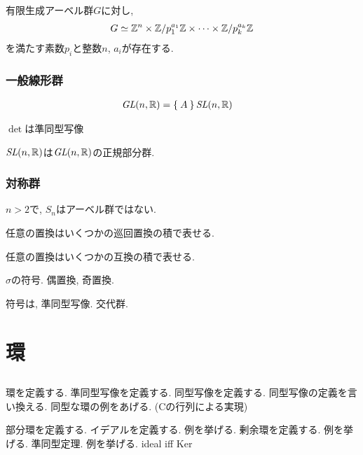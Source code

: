   
  \begin{theorem}
    [有限生成アーベル群の基本定理]
    有限生成アーベル群$G$に対し,
    \begin{align*}
      G\simeq \mathbb{Z}^n \times \mathbb{Z}/p_1^{a_1} \mathbb{Z} \times \cdots \times \mathbb{Z}/p_k^{a_k}\mathbb{Z}
    \end{align*}
    を満たす素数$p_i$と整数$n$, $a_i$が存在する.
  \end{theorem}


  \subsection{一般線形群}
  \begin{align*}
    \textit{GL}(n,\mathbb{R})&=\Set{A}
    \textit{SL}(n,\mathbb{R})&
  \end{align*}
  \begin{prop}
    $\det$は準同型写像
  \end{prop}
  \begin{prop}
    $\textit{SL}(n,\mathbb{R})$は$\textit{GL}(n,\mathbb{R})$の正規部分群.
  \end{prop}

  \subsection{対称群}
  $n>2$で,
  $S_n$はアーベル群ではない.

  \begin{theorem}
    任意の置換はいくつかの巡回置換の積で表せる.
  \end{theorem}
  \begin{theorem}
    任意の置換はいくつかの互換の積で表せる.
  \end{theorem}

  \begin{definition}
    $\sigma$の符号.  偶置換, 奇置換.
  \end{definition}

  符号は, 準同型写像.  交代群.

  \chapter{環}
  \section{}
 環を定義する.
 準同型写像を定義する.
 同型写像を定義する.
 同型写像の定義を言い換える.
 同型な環の例をあげる.
 (Cの行列による実現)
 
 部分環を定義する.
 イデアルを定義する.
 例を挙げる.
 剰余環を定義する.
 例を挙げる.
 準同型定理.
 例を挙げる.
 ideal iff Ker
 

